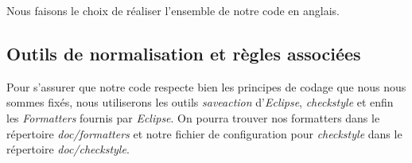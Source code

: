 \documentclass[11pt]{article}
\begin{document}
Nous faisons le choix de réaliser l'ensemble de notre code en anglais.

\subsection{Outils de normalisation et règles associées}

Pour s'assurer que notre code respecte bien les principes de codage que nous nous sommes fixés, nous utiliserons les outils \emph{saveaction} d'\emph{Eclipse}, \emph{checkstyle} et enfin les \emph{Formatters} fournis par \emph{Eclipse}. On pourra trouver nos formatters dans le répertoire \emph{doc/formatters} et notre fichier de configuration pour \emph{checkstyle} dans le répertoire \emph{doc/checkstyle}.
\end{document}
